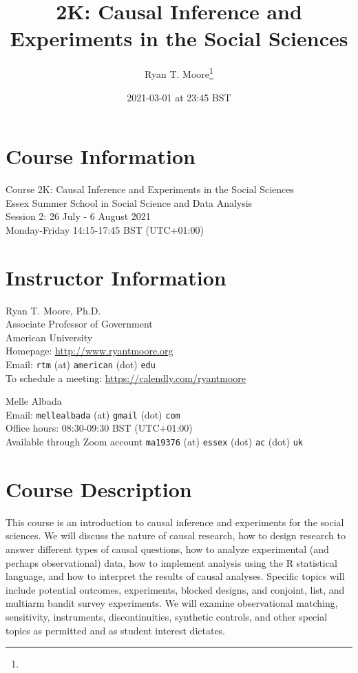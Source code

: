 \documentclass[11pt]{article}
\title{2K: Causal Inference and Experiments in the Social Sciences}
\author{Ryan T. Moore\footnote{\rtmaddr}}
\date{2021-03-01 at 23:45 BST}
\begin{document}
\maketitle

\section*{Course Information}
Course 2K: Causal Inference and Experiments in the Social Sciences\\
Essex Summer School in Social Science and Data Analysis\\
Session 2: 26 July - 6 August 2021\\
Monday-Friday 14:15-17:45 BST (UTC+01:00)

\section*{Instructor Information}
Ryan T. Moore, Ph.D. \\
Associate Professor of Government\\
American University\\
Homepage: \url{http://www.ryantmoore.org} \\
Email: {\tt rtm} (at) {\tt american} (dot) {\tt edu} \\
To schedule a meeting: \url{https://calendly.com/ryantmoore}\\

\vspace{.1in}

\noindent Melle Albada\\
Email: {\tt mellealbada} (at) {\tt gmail} (dot) {\tt com} \\
Office hours: 08:30-09:30 BST (UTC+01:00) \\
Available through Zoom account {\tt ma19376} (at) {\tt essex} (dot) {\tt ac} (dot) {\tt uk}



\section*{Course Description}

This course is an introduction to causal inference and experiments for the social sciences.  We will discuss the nature of causal research, how to design research to answer different types of causal questions, how to analyze experimental (and perhaps observational) data, how to implement analysis using the R statistical language, and how to interpret the results of causal analyses.  Specific topics will include potential outcomes, experiments, blocked designs, and conjoint, list, and multiarm bandit survey experiments.  We will examine observational matching, sensitivity, instruments, discontinuities, synthetic controls, and other special topics as permitted and as student interest dictates.
\end{document}
